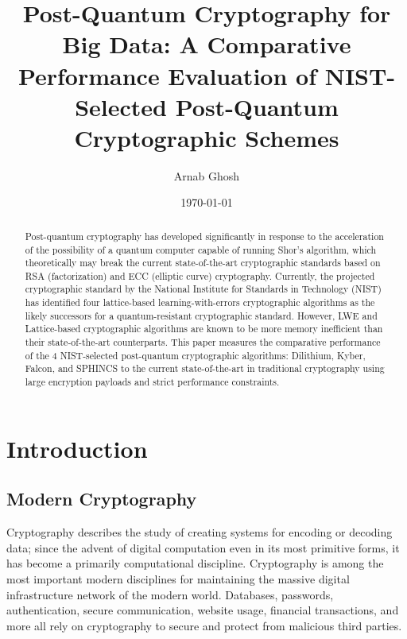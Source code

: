 \documentclass[12pt]{article}
\title{Post-Quantum Cryptography for Big Data: A Comparative Performance Evaluation of NIST-Selected Post-Quantum Cryptographic Schemes}
\author{Arnab Ghosh}
\date{\today}
\begin{document}
\maketitle

\begin{abstract}
    Post-quantum cryptography has developed significantly in response to the acceleration of the possibility of a quantum computer capable of running Shor's algorithm, which theoretically may break the current state-of-the-art cryptographic standards based on RSA (factorization) and ECC (elliptic curve) cryptography. 
    Currently, the projected cryptographic standard by the National Institute for Standards in Technology (NIST) has identified four lattice-based learning-with-errors cryptographic algorithms as the likely successors for a quantum-resistant cryptographic standard. 
    However, LWE and Lattice-based cryptographic algorithms are known to be more memory inefficient than their state-of-the-art counterparts. 
    This paper measures the comparative performance of the 4 NIST-selected post-quantum cryptographic algorithms: Dilithium, Kyber, Falcon, and SPHINCS to the current state-of-the-art in traditional cryptography using large encryption payloads and strict performance constraints.  
\end{abstract}

\section{Introduction}
\subsection{Modern Cryptography}\label{subsec:cryptography}
Cryptography describes the study of creating systems for encoding or decoding data; since the advent of digital computation even in its most primitive forms, it has become a primarily computational discipline.
Cryptography is among the most important modern disciplines for maintaining the massive digital infrastructure network of the modern world.
Databases, passwords, authentication, secure communication, website usage, financial transactions, and more all rely on cryptography to secure and protect from malicious third parties.
\end{document}
